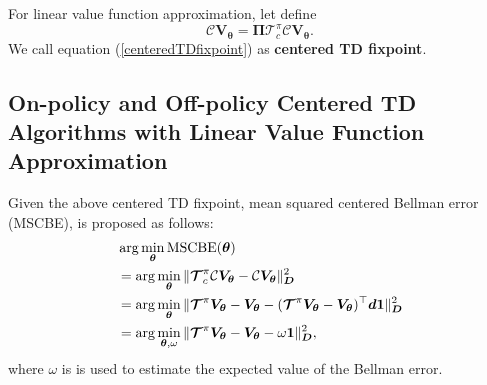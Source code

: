 For linear value function approximation, let define
\begin{equation}
\mathcal{C}\bm{V}_{\bm{\theta}}=\bm{\Pi}\bm{\mathcal{T}}_c^{\pi}\mathcal{C}\bm{V}_{\bm{\theta}}.
\label{centeredTDfixpoint}
\end{equation}
We call equation (\ref{centeredTDfixpoint}) as \textbf{centered TD fixpoint}.

\subsection{On-policy and Off-policy Centered TD Algorithms
with Linear Value Function Approximation}
Given the above centered TD fixpoint,
 mean squared centered Bellman error (MSCBE), is proposed as follows:
\begin{align*}
    \label{argminMSBEC}
 &\arg \min_{{\bm{\theta}}}\text{MSCBE}({\bm{\theta}}) \\
 &= \arg \min_{{\bm{\theta}}} \|\bm{\mathcal{T}}_c^{\pi}\mathcal{C}\bm{V}_{\bm{{\bm{\theta}}}}-\mathcal{C}\bm{V}_{\bm{{\bm{\theta}}}}\|_{\bm{D}}^2\notag\\
 &=\arg \min_{{\bm{\theta}}} \|\bm{\mathcal{T}}^{\pi}\bm{V}_{\bm{{\bm{\theta}}}} - \bm{V}_{\bm{{\bm{\theta}}}}-(\bm{\mathcal{T}}^{\pi}\bm{V}_{\bm{{\bm{\theta}}}} - \bm{V}_{\bm{{\bm{\theta}}}})^{\top}\bm{d}\bm{1}\|_{\bm{D}}^2\notag\\
 &=\arg \min_{{\bm{\theta}},\omega} \| \bm{\mathcal{T}}^{\pi}\bm{V}_{\bm{{\bm{\theta}}}} - \bm{V}_{\bm{{\bm{\theta}}}}-\omega\bm{1} \|_{\bm{D}}^2\notag,
\end{align*}
where $\omega$ is is used to estimate the expected value of the Bellman error.

